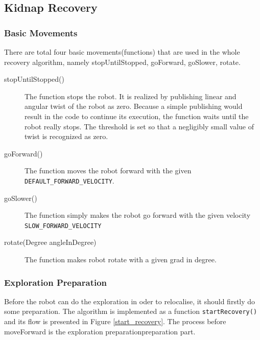 \subsection{Kidnap Recovery}
\subsubsection{Basic Movements}
There are total four basic movements(functions) that are used in the whole recovery algorithm, namely stopUntilStopped, goForward, goSlower, rotate.

\begin{description}
\item[stopUntilStopped()] \label{stopUntilStopped}
The function stops the robot. It is realized by publishing linear and angular twist of the robot as zero. Because a simple publishing would result in the code to continue its execution, the function waits until the robot really stops. The threshold is set so that a negligibly small value of twist is recognized as zero.

\item[goForward()] \label{goForward}
The function moves the robot forward with the given \texttt{DEFAULT\_FORWARD\_VELOCITY}.

\item[goSlower()] \label{goSlower}
The function simply makes the robot go forward with the given velocity \\ \texttt{SLOW\_FORWARD\_VELOCITY}

\item[rotate(Degree angleInDegree)] \label{rotate}
The function makes robot rotate with a given grad in degree.
\end{description}

\subsubsection{Exploration Preparation}
Before the robot can do the exploration in oder to relocalise, it should firstly do some preparation. The algorithm is implemented as a function \texttt{startRecovery()} and its flow is presented in Figure \ref{start_recovery}. The process before moveForward is the exploration preparationpreparation part.

